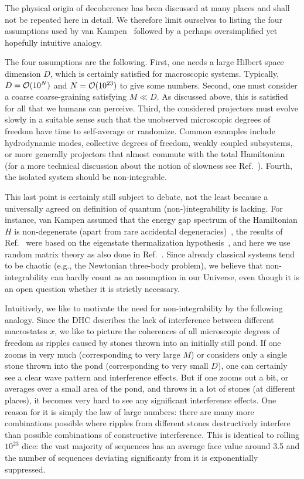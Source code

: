 \documentclass[pre,twocolumn,10pt,aps,longbibliography,nofootinbib]{revtex4-1}
\newcommand{\C}[1]{{\cal{#1}}}
\newcommand{\blue}[1]{#1}
\begin{document}
The physical origin of decoherence has been discussed at many places and shall not be repeated here in detail. We therefore limit ourselves to listing the four assumptions used by van Kampen~\cite{VanKampenPhys1954} followed by a perhaps oversimplified yet hopefully intuitive analogy.

The four assumptions are the following. First, one needs a large Hilbert space dimension $D$, which is certainly satisfied for macroscopic systems. Typically, $D=\C O(10^N)$ and $N=\C O(10^{23})$ to give some numbers. Second, one must consider a coarse coarse-graining satisfying $M\ll D$. As discussed above, this is satisfied for all that we humans can perceive. Third, the considered projectors must evolve slowly in a suitable sense such that the unobserved microscopic degrees of freedom have time to self-average or randomize. Common examples include hydrodynamic modes, collective degrees of freedom, weakly coupled subsystems, or more generally projectors that almost commute with the total Hamiltonian \blue{(for a more technical discussion about the notion of slowness see Ref.~\cite{StrasbergEtAlPRA2023})}. Fourth, the isolated system should be non-integrable.

This last point is certainly still subject to debate, not the least because a universally agreed on definition of quantum (non-)integrability is lacking. For instance, van Kampen assumed that the energy gap spectrum of the Hamiltonian $H$ is non-degenerate (apart from rare accidental degeneracies)~\cite{VanKampenPhys1954}, the results of Ref.~\cite{GemmerSteinigewegPRE2014, SchmidtkeGemmerPRE2016, NationPorrasPRE2020, StrasbergEtAlPRA2023} were based on the eigenstate thermalization hypothesis~\cite{DAlessioEtAlAP2016, DeutschRPP2018}, and here we use random matrix theory as also done in Ref.~\cite{NationPorrasPRE2020, StrasbergSP2023}. Since already classical systems tend to be chaotic (e.g., the Newtonian three-body problem), we believe that non-integrability can hardly count as an assumption in our Universe, even though it is an open question whether it is strictly necessary.

Intuitively, we like to motivate the need for non-integrability by the following analogy. Since the DHC describes the lack of interference between different macrostates $x$, we like to picture the coherences of all microscopic degrees of freedom as ripples caused by stones thrown into an initially still pond. If one zooms in very much (corresponding to very large $M$) or considers only a single stone thrown into the pond (corresponding to very small $D$), one can certainly see a clear wave pattern and interference effects. But if one zooms out a bit, or averages over a small area of the pond, and throws in a lot of stones (at different places), it becomes very hard to see any significant interference effects. One reason for it is simply the law of large numbers: there are many more combinations possible where ripples from different stones destructively interfere than possible combinations of constructive interference. This is identical to rolling $10^{23}$ dice: the vast majority of sequences has an average face value around 3.5 and the number of sequences deviating significanty from it is exponentially suppressed.
\end{document}
